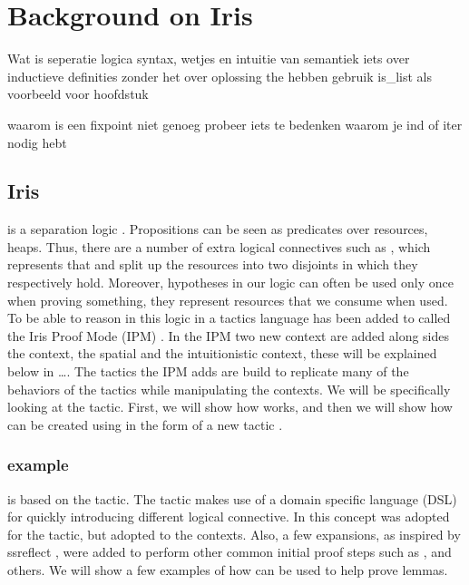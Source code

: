 \documentclass[thesis.tex]{subfiles}
\begin{document}
\chapter{Background on Iris}
Wat is seperatie logica
syntax, wetjes en intuitie van semantiek
iets over inductieve definities zonder het over oplossing the hebben
gebruik is_list als voorbeeld voor hoofdstuk

waarom is een fixpoint niet genoeg
probeer iets te bedenken waarom je ind of iter nodig hebt


\section[Iris iIntros]{Iris }
\iris is a separation logic \cite*{jungIrisMonoidsInvariants2015a,jungHigherorderGhostState2016,krebbersEssenceHigherOrderConcurrent2017,jungIrisGroundModular2018}. Propositions can be seen as predicates over resources, \eg heaps. Thus, there are a number of extra logical connectives such as , which represents that  and  split up the resources into two disjoints in which they respectively hold. Moreover, hypotheses in our logic can often be used only once when proving something, they represent resources that we consume when used. To be able to reason in this logic in \coq a tactics language has been added to \coq called the Iris Proof Mode (IPM) \cite*{krebbersInteractiveProofsHigherorder2017,krebbersMoSeLGeneralExtensible2018}. In the IPM two new context are added along sides the \coq context, the spatial and the intuitionistic context, these will be explained below in \ldots.
The tactics the IPM adds are build to replicate many of the behaviors of the \coq tactics while manipulating the \iris contexts. We will be specifically looking at the  tactic. First, we will show how  works, and then we will show how  can be created using \elpi in the form of a new tactic .

\subsection[iIntros example]{ example}
 is based on the \coq {} tactic. The \coq {} tactic makes use of a domain specific language (DSL) for quickly introducing different logical connective. In \iris this concept was adopted for the  tactic, but adopted to the \iris contexts. Also, a few expansions, as inspired by ssreflect \cite*{huetCoqProofAssistant1997, gonthierSmallScaleReflection2016}, were added to perform other common initial proof steps such as ,  and others. We will show a few examples of how  can be used to help prove lemmas.
\end{document}
